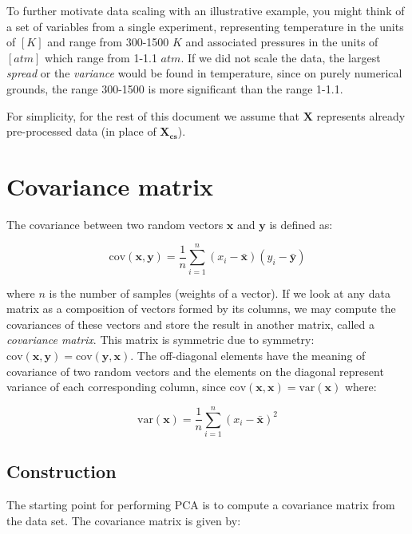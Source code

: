 \documentclass[10pt,twocolumn]{article}
\begin{document}
To further motivate data scaling with an illustrative example, you might think of a set of variables from a single experiment, representing temperature in the units of $[K]$ and range from 300-1500 $K$ and associated pressures in the units of $[atm]$ which range from 1-1.1 $atm$. If we did not scale the data, the largest \textit{spread} or the \textit{variance} would be found in temperature, since on purely numerical grounds, the range 300-1500 is more significant than the range 1-1.1.

For simplicity, for the rest of this document we assume that $\bm{X}$ represents already pre-processed data (in place of $\bm{X_{cs}}$).

\section{Covariance matrix}

The covariance between two random vectors $\bm{x}$ and $\bm{y}$ is defined as:

\begin{equation}\label{eq:covariance-definition}
\text{cov}(\bm{x},\bm{y}) = \frac{1}{n} \sum_{i=1}^{n} (x_i - \bar{\bm{x}}) (y_i - \bar{\bm{y}})
\end{equation}

where $n$ is the number of samples (weights of a vector). If we look at any data matrix as a composition of vectors formed by its columns, we may compute the covariances of these vectors and store the result in another matrix, called a \textit{covariance matrix}. This matrix is symmetric due to symmetry: $\text{cov}(\bm{x},\bm{y}) = \text{cov}(\bm{y},\bm{x})$. The off-diagonal elements have the meaning of covariance of two random vectors and the elements on the diagonal represent variance of each corresponding column, since $\text{cov}(\bm{x},\bm{x}) = \text{var}(\bm{x})$ where:

\begin{equation}\label{eq:variance-definition}
\text{var}(\bm{x}) = \frac{1}{n} \sum_{i=1}^{n} (x_i - \bar{\bm{x}})^2
\end{equation}

\subsection{Construction}

The starting point for performing PCA is to compute a covariance matrix from the data set. The covariance matrix is given by:
\end{document}
